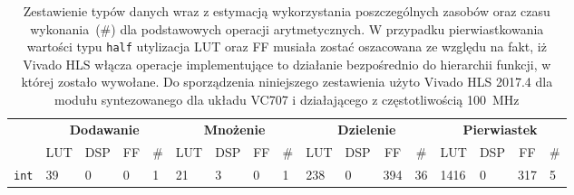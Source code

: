 \begin{landscape}
\phantom{\rule{1em}{6em}}
\begin{table}[H]
\centering
\caption[Zestawienie typów danych wraz z estymacją wykorzystania poszczególnych zasobów oraz czasu wykonania dla podstawowych operacji arytmetycznych]{Zestawienie typów danych wraz z estymacją wykorzystania poszczególnych zasobów oraz czasu wykonania~(\#) dla podstawowych operacji arytmetycznych. W przypadku pierwiastkowania wartości typu \texttt{half} utylizacja LUT oraz FF musiała zostać oszacowana ze względu na fakt, iż Vivado HLS włącza operacje implementujące to działanie bezpośrednio do hierarchii funkcji, w której zostało wywołane. Do sporządzenia niniejszego zestawienia użyto Vivado HLS 2017.4 dla modułu syntezowanego dla układu VC707 i działającego z częstotliwością 100~MHz}
\label{ch3:tab:op_type_util_time}
\begin{tabular}{|r|l|l|l|l||l|l|l|l||l|l|l|l||l|l|l|l|}
\hline
\multicolumn{1}{|l|}{\multirow{2}{*}{}}           & \multicolumn{4}{c||}{\textbf{Dodawanie}}                                                                       & \multicolumn{4}{c||}{\textbf{Mnożenie}}                                                                       & \multicolumn{4}{c||}{\textbf{Dzielenie}}                                                                      & \multicolumn{4}{c|}{\textbf{Pierwiastek}}                                                                    \\ \cline{2-17} 
\multicolumn{1}{|l|}{}                            & \multicolumn{1}{c|}{LUT} & \multicolumn{1}{c|}{DSP} & \multicolumn{1}{c|}{FF} & \multicolumn{1}{c||}{\#} & \multicolumn{1}{c|}{LUT} & \multicolumn{1}{c|}{DSP} & \multicolumn{1}{c|}{FF} & \multicolumn{1}{c||}{\#} & \multicolumn{1}{c|}{LUT} & \multicolumn{1}{c|}{DSP} & \multicolumn{1}{c|}{FF} & \multicolumn{1}{c||}{\#} & \multicolumn{1}{c|}{LUT} & \multicolumn{1}{c|}{DSP} & \multicolumn{1}{c|}{FF} & \multicolumn{1}{c|}{\#} \\ \hline
\texttt{int}                                      & 39                       & 0                        & 0                       & 1                             & 21                       & 3                        & 0                       & 1                            & 238                      & 0                        & 394                     & 36                           & 1416                     & 0                        & 317                     & 5                            \\ \hline

\end{tabular}
\end{table}
\end{landscape}
